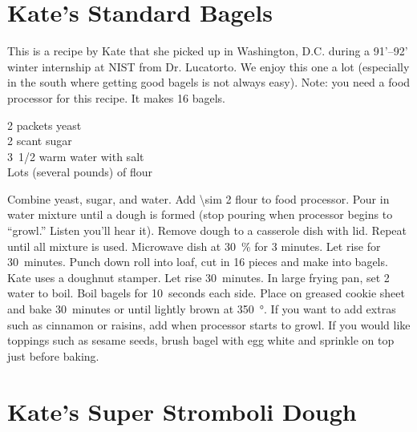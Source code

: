 \section{Kate's Standard Bagels}

\begin{open}
  This is a recipe by Kate that she picked up in Washington, D.C. during
  a 91'--92' winter internship at NIST from Dr. Lucatorto.  We enjoy this one
  a lot (especially in the south where getting good bagels is not always
  easy). Note: you need a food processor for this recipe. It makes 16 bagels.
\end{open}
\begin{ingredients}
  2 packets yeast \\
  2 scant \si{\tblspoon} sugar\\
  \SI{1/2}[3]{\cup} warm water with salt \\
  Lots (several pounds) of flour
\end{ingredients}
Combine yeast, sugar, and water.  Add \SI{\sim 2}{\cup} flour to food
processor. Pour in water mixture until a dough is formed (stop pouring when
processor begins to ``growl.'' Listen you'll hear it).  Remove dough to a
casserole dish with lid. Repeat until all mixture is used.  Microwave dish at
\SI{30}{\percent} for 3 minutes.  Let rise for 30~minutes.  Punch down roll
into loaf, cut in 16 pieces and make into bagels. Kate uses a doughnut
stamper. Let rise 30~minutes. In large frying pan, set \SI{2}{\inch} water to
boil.  Boil bagels for 10~seconds each side.  Place on greased cookie sheet
and bake 30~minutes or until lightly brown at \SI{350}{\degree}. If you want
to add extras such as cinnamon or raisins, add when processor starts to
growl. If you would like toppings such as sesame seeds, brush bagel with egg
white and sprinkle on top just before baking.

\section{Kate's Super Stromboli Dough}

